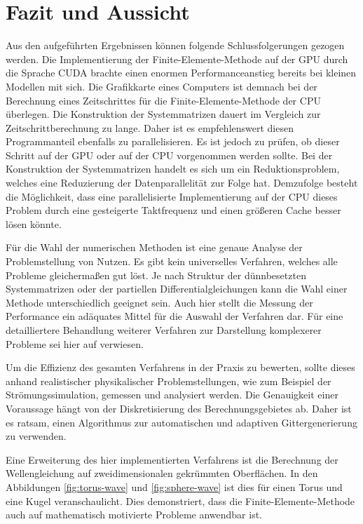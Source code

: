 \documentclass[crop=false]{standalone}
\begin{document}
  \section{Fazit und Aussicht} %
  \label{sec:conclusion}

    Aus den aufgeführten Ergebnissen können folgende Schlussfolgerungen gezogen werden.
    Die Implementierung der Finite-Elemente-Methode auf der GPU durch die Sprache CUDA brachte einen enormen Performanceanstieg bereits bei kleinen Modellen mit sich.
    Die Grafikkarte eines Computers ist demnach bei der Berechnung eines Zeitschrittes für die Finite-Elemente-Methode der CPU überlegen.
    Die Konstruktion der Systemmatrizen dauert im Vergleich zur Zeitschrittberechnung zu lange.
    Daher ist es empfehlenswert diesen Programmanteil ebenfalls zu parallelisieren.
    Es ist jedoch zu prüfen, ob dieser Schritt auf der GPU oder auf der CPU vorgenommen werden sollte.
    Bei der Konstruktion der Systemmatrizen handelt es sich um ein Reduktionsproblem, welches eine Reduzierung der Datenparallelität zur Folge hat.
    Demzufolge besteht die Möglichkeit, dass eine parallelisierte Implementierung auf der CPU dieses Problem durch eine gesteigerte Taktfrequenz und einen größeren Cache besser lösen könnte.

    Für die Wahl der numerischen Methoden ist eine genaue Analyse der Problemstellung von Nutzen.
    Es gibt kein universelles Verfahren, welches alle Probleme gleichermaßen gut löst.
    Je nach Struktur der dünnbesetzten Systemmatrizen oder der partiellen Differentialgleichungen kann die Wahl einer Methode unterschiedlich geeignet sein.
    Auch hier stellt die Messung der Performance ein adäquates Mittel für die Auswahl der Verfahren dar.
    Für eine detailliertere Behandlung weiterer Verfahren zur Darstellung komplexerer Probleme sei hier auf \cite{Bell2008,Bell2009,Nocedal2006,Logan2007} verwiesen.

    Um die Effizienz des gesamten Verfahrens in der Praxis zu bewerten, sollte dieses anhand realistischer physikalischer Problemstellungen, wie zum Beispiel der Strömungssimulation, gemessen und analysiert werden.
    Die Genauigkeit einer Voraussage hängt von der Diskretisierung des Berechnungsgebietes ab.
    Daher ist es ratsam, einen Algorithmus zur automatischen und adaptiven Gittergenerierung zu verwenden.

    Eine Erweiterung des hier implementierten Verfahrens ist die Berechnung der Wellengleichung auf zweidimensionalen gekrümmten Oberflächen.
    In den Abbildungen \ref{fig:torus-wave} und \ref{fig:sphere-wave} ist dies für einen Torus und eine Kugel veranschaulicht.
    Dies demonstriert, dass die Finite-Elemente-Methode auch auf mathematisch motivierte Probleme anwendbar ist.
\end{document}
